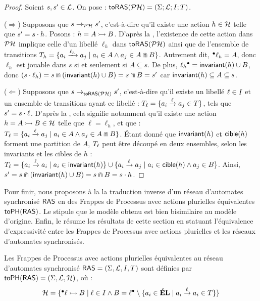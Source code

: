 \begin{proof}
  Soient $s, s' \in \mathcal{L}$.
  On pose : $\mathsf{toRAS}(\mathcal{PH}) = (\Sigma; \mathcal{L}; I; T)$.
  
  ($\Rightarrow$) Supposons que $s \rightarrow_{\mathcal{PH}} s'$, c'est-à-dire qu'il existe une action $h \in \mathcal{H}$
    telle que $s' = s \cdot h$.
    Posons : $h = \mbox{$A \rightarrowtail B$}$.
    D'après la ,
    l'existence de cette action dans $\mathcal{PH}$ implique celle d'un libellé $\ell_h$ dans $\mathsf{toRAS}(\mathcal{PH})$
    ainsi que de l'ensemble de transitions
    $T_h = \{ a_i \xrightarrow{\ell_h} a_j \mid a_i \in A \wedge a_j \in A \Cap B \}$.
    Autrement dit, ${}^\bullet \ell_h = A$, donc $\ell_h$ est jouable dans $s$
    si et seulement si $A \subseteq s$.
    De plus, $\ell_h {}^\bullet = \mathsf{invariant}(h) \cup B$, donc
    $(s \cdot \ell_h) = s \Cap (\mathsf{invariant}(h) \cup B) = s \Cap B = s'$
    car $\mathsf{invariant}(h) \subseteq A \subseteq s$.
  
  ($\Leftarrow$) Supposons que $s \rightarrow_{\mathsf{toRAS}(\mathcal{PH})} s'$,
    c'est-à-dire qu'il existe un libellé $\ell \in I$ et un ensemble de transitions
    ayant ce libellé : $T_\ell = \{ a_i \xrightarrow{\ell} a_j \in T \}$,
    tels que $s' = s \cdot \ell$.
    D'après la , cela signifie notamment qu'il existe une action
    $h = \mbox{$A \rightarrowtail B$} \in \mathcal{H}$ telle que $\ell = \ell_h$, et que :
    $T_\ell = \{ a_i \xrightarrow{\ell} a_j \mid a_i \in A \wedge a_j \in A \Cap B \}$.
    Étant donné que $\mathsf{invariant}(h)$ et $\mathsf{cible}(h)$ forment une partition de $A$,
    $T_\ell$ peut être découpé en deux ensembles, selon les invariants et les cibles de $h$ :
    $T_\ell = \{ a_i \xrightarrow{\ell} a_i \mid a_i \in \mathsf{invariant}(h) \} \cup
      \{ a_i \xrightarrow{\ell} a_j \mid a_i \in \mathsf{cible}(h) \wedge a_j \in B \}$.
    Ainsi, $s' = s \Cap (\mathsf{invariant}(h) \cup B) = s \Cap B = s \cdot h$.
\end{proof}

Pour finir, nous proposons à la  la traduction inverse
d'un réseau d'automates synchronisé $\mathsf{RAS}$
en des Frappes de Processus avec actions plurielles équivalentes $\mathsf{toPH}(\mathsf{RAS})$.
Le  stipule que le modèle obtenu est bien bisimilaire
au modèle d'origine.
Enfin, le  résume les résultats de cette section
en statuant l'équivalence d'expressivité entre les Frappes de Processus avec
actions plurielles et les réseaux d'automates synchronisés.

\begin{definition}
  Les Frappes de Processus avec actions plurielles
  équivalentes au réseau d'automates synchronisé $\mathsf{RAS} = (\Sigma, \mathcal{L}, I, T)$
  sont définies par $\mathsf{toPH}(\mathsf{RAS}) = (\Sigma, \mathcal{L}, \mathcal{H})$, où :
  \[\mathcal{H} = \{ \mbox{${}^\bullet \ell \rightarrowtail B$} \mid \ell \in I \wedge
    B = \ell {}^\bullet \setminus \{ a_i \in \mathbf{\acute{E}L} \mid a_i \xrightarrow{\ell} a_i \in T \}
    \}\]
\end{definition}


